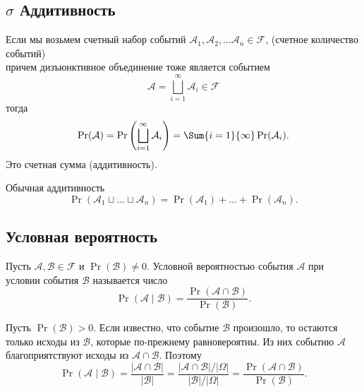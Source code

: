 \subsection{$\sigma$ Аддитивность}
\begin{definition}
    Если мы возьмем счетный набор событий $\mathcal{A}_1, \mathcal{A}_2, \dots \mathcal{A}_n\in \mathcal{F}$, (счетное количество событий)\\
    причем дизъюнктивное объединение тоже является событием
    \[
        \mathcal{A} = \bigsqcup_{i=1}^{\infty} \mathcal{A}_i \in \mathcal{F}
    \]
    тогда 
    \[
    \Pr(\mathcal{A})
    =
    \Pr\left(\bigsqcup_{i=1}^{\infty} \mathcal{A}_i\right)
    =
    \Sum{i=1}{\infty} \Pr(\mathcal{A}_i).
    \]
    Это счетная сумма (аддитивность).
\end{definition}

\begin{exercise}[Замечание]
        Обычная аддитивность
        \[
    \Pr\left(\mathcal{A}_1 \sqcup \dots \sqcup \mathcal{A}_n\right)
    =
    \Pr(\mathcal{A}_1) + \dots + \Pr(\mathcal{A}_n).
\]
\end{exercise}

\subsection{Условная вероятность}
\begin{definition}
    Пусть $\mathcal{A}, \mathcal{B} \in \mathcal{F}$
    и $\Pr(\mathcal{B}) \neq 0$.
    Условной вероятностью события $\mathcal{A}$
    при условии события $\mathcal{B}$ называется число
    \[
        \Pr(\mathcal{A} \mid \mathcal{B})
        =
        \frac{\Pr(\mathcal{A} \cap \mathcal{B})}{\Pr(\mathcal{B})}.
    \]
\end{definition}

\begin{Proof}

Пусть $\Pr(\mathcal{B}) > 0$. Если известно, что событие
$\mathcal{B}$ произошло, то остаются только исходы из
$\mathcal{B}$, которые по-прежнему равновероятны.
Из них событию $\mathcal{A}$ благоприятствуют исходы
из $\mathcal{A} \cap \mathcal{B}$. Поэтому
\[
    \Pr(\mathcal{A} \mid \mathcal{B})
    =
    \frac{|\mathcal{A} \cap \mathcal{B}|}{|\mathcal{B}|}
    =
    \frac{
        |\mathcal{A} \cap \mathcal{B}| / |\Omega|
    }{
        |\mathcal{B}| / |\Omega|
    }
    =
    \frac{\Pr(\mathcal{A} \cap \mathcal{B})}{\Pr(\mathcal{B})}.
\]
\end{Proof}

